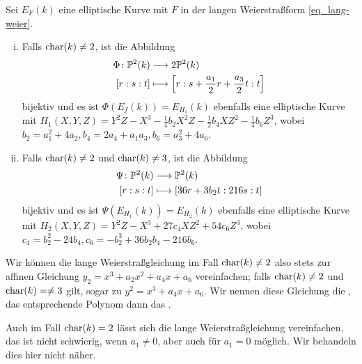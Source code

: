 \begin{satz}
\label{satz_11.8}
	Sei $E_F(k)$ eine elliptische Kurve mit $F$ in der langen Weierstraßform \eqref{eq_lang-weier}. \begin{enumerate}[(i)]
		\item Falls $\Char(k) \neq 2$, ist die Abbildung
		\begin{equation}
		\begin{aligned}
			\Phi \colon \PP^2(k) &\longrightarrow 2\PP^2(k) \\
			[r:s:t] &\longmapsto \benbrace*{r : s + \frac{a_1}{2}r + \frac{a_3}{2}t : t}
		\end{aligned}
		\end{equation}
		bijektiv und es ist $\Phi(E_f(k)) = E_{H_1}(k)$ ebenfalls eine elliptische Kurve mit $H_1(X,Y,Z) = Y^2Z - X^3 - \frac{1}{4}b_2 X^2Z - \frac{1}{2} b_4 XZ^2 - \frac{1}{4} b_6 Z^3$, wobei $b_2 = a_1^2 + 4a_2, b_4 = 2a_4 + a_1 a_3, b_6 = a_3^2 + 4a_6$.
		\item Falls $\Char(k) \neq 2$ und $\Char(k) \neq 3$, ist die Abbildung
		\begin{equation}
		\begin{aligned}
			\Psi\colon \PP^2(k) &\longrightarrow \PP^2(k) \\
			[r:s:t] &\longmapsto [36r + 3b_2 t : 216s : t]
		\end{aligned}
		\end{equation}
		bijektiv und es ist $\Psi(E_{H_1}(k)) = E_{H_2}(k)$ ebenfalls eine elliptische Kurve mit $H_2(X,Y,Z) = Y^2Z - X^3 + 27c_4 XZ^2 + 54 c_6 Z^3$, wobei $c_4 = b_2^2 - 24b_4, c_6 = -b_2^3 + 36b_2b_4 - 216b_6$.
	\end{enumerate}
\end{satz}

\begin{bem}
	Wir können die lange Weierstraßgleichung im Fall $\Char(k) \neq 2$ also stets zur affinen Gleichung $y_2 = x^3 + a_2x^2 + a_4 x + a_6$ vereinfachen; falls $\Char(k) \neq 2$ und $\Char(k)= \neq 3$ gilt, sogar zu $y^2 = x^3 + a_4 x + a_6$. Wir nennen diese Gleichung die , das entsprechende Polynom dann das .
\end{bem}

\begin{bem}
	Auch im Fall $\Char(k) = 2$ lässt sich die lange Weierstraßgleichung vereinfachen, das ist nicht schwierig, wenn $a_1 \neq 0$, aber auch für $a_1 = 0$ möglich. Wir behandeln dies hier nicht näher.
\end{bem}

